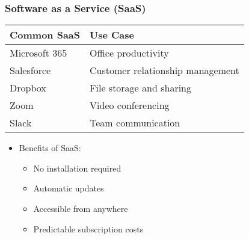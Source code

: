 \documentclass{beamer}
\begin{document}
\begin{frame}
    \frametitle{Software as a Service (SaaS)}
    
    \begin{tabular}{|p{}|p{}|}
        \hline
        \textbf{Common SaaS} & \textbf{Use Case} \\
        \hline
        Microsoft 365 & Office productivity \\
        \hline
        Salesforce & Customer relationship management \\
        \hline
        Dropbox & File storage and sharing \\
        \hline
        Zoom & Video conferencing \\
        \hline
        Slack & Team communication \\
        \hline
    \end{tabular}
    
    \begin{itemize}
        \item Benefits of SaaS:
        \begin{itemize}
            \item No installation required
            \item Automatic updates
            \item Accessible from anywhere
            \item Predictable subscription costs
        \end{itemize}
    \end{itemize}
\end{frame}
\end{document}
